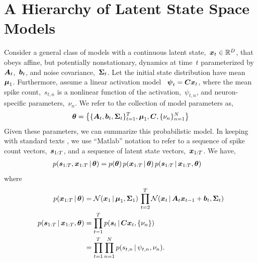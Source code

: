 \section{A Hierarchy of Latent State Space Models}
Consider a general class of models with a continuous latent
state,~$\boldsymbol{x}_t \in \mathbb{R}^D$, that obeys affine, but potentially
nonstationary, dynamics at time~$t$ parameterized by~$\boldsymbol{A}_t$,~$\boldsymbol{b}_t$, and
noise covariance,~$\boldsymbol{\Sigma}_t$. Let the initial state distribution have
mean~$\boldsymbol{\mu}_1$. Furthermore, assume a linear activation model
~$\boldsymbol{\psi}_t = \boldsymbol{C} \boldsymbol{x}_t$, where the mean spike count,~$s_{t,n}$ is a
nonlinear function of the activation,~$\psi_{t,n}$, and neuron-specific
parameters,~$\nu_n$.  We refer to the collection of model parameters
as,
\begin{align*}
  \boldsymbol{\theta} = \left\{ \{\boldsymbol{A}_t, \boldsymbol{b}_t, \boldsymbol{\Sigma}_t\}_{t=1}^T, \boldsymbol{\mu}_1, \boldsymbol{C}, \{\nu_n\}_{n=1}^N \right\}
\end{align*}
Given these parameters, we can summarize this probabilistic model.  In
keeping with standard texts \citep[e.g.][Chapter
18]{murphy2012probabilistic}, we use ``Matlab'' notation to refer to
a sequence of spike count vectors,~$\boldsymbol{s}_{1:T}$, and a sequence of
latent state vectors,~$\boldsymbol{x}_{1:T}$. We have,
\begin{align*}
  p(\boldsymbol{s}_{1:T}, \boldsymbol{x}_{1:T} \,|\,  \boldsymbol{\theta}) 
  &= 
    p(\boldsymbol{\theta}) \, p (\boldsymbol{x}_{1:T} \,|\, \boldsymbol{\theta}) \, p(\boldsymbol{s}_{1:T} \,|\, \boldsymbol{x}_{1:T}, \boldsymbol{\theta})
\end{align*}
where
\begin{align}
  \nonumber
  p(\boldsymbol{x}_{1:T} \,|\, \boldsymbol{\theta}) 
  &= 
    \mathcal{N}(\boldsymbol{x}_1 \,|\, \boldsymbol{\mu}_1, \boldsymbol{\Sigma}_1) \,
    \prod_{t=2}^T \mathcal{N}(\boldsymbol{x}_t \,|\, \boldsymbol{A}_t \boldsymbol{x}_{t-1} + \boldsymbol{b}_t, \boldsymbol{\Sigma}_t)
  \\
  \nonumber
  p(\boldsymbol{s}_{1:T} \,|\, \boldsymbol{x}_{1:T}, \boldsymbol{\theta}) 
  &= 
    \prod_{t=1}^T p(\boldsymbol{s}_{t} \,|\, \boldsymbol{C} \boldsymbol{x}_t, \{\nu_n\}) \\
  \label{eq:s_likelihood}
  &=
    \prod_{t=1}^T \prod_{n=1}^N p(s_{t,n} \,|\, \psi_{t,n}, \nu_n).
\end{align}

